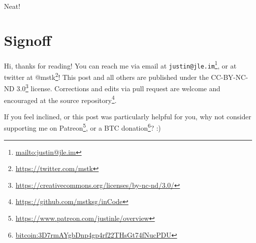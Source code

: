 \documentclass[]{article}
\renewcommand{\href}[2]{#2\footnote{\url{#1}}}
\begin{document}
Neat!

\hypertarget{signoff}{%
\section{Signoff}\label{signoff}}

Hi, thanks for reading! You can reach me via email at
\href{mailto:justin@jle.im}{\nolinkurl{justin@jle.im}}, or at twitter at
\href{https://twitter.com/mstk}{@mstk}! This post and all others are published
under the \href{https://creativecommons.org/licenses/by-nc-nd/3.0/}{CC-BY-NC-ND
3.0} license. Corrections and edits via pull request are welcome and encouraged
at \href{https://github.com/mstksg/inCode}{the source repository}.

If you feel inclined, or this post was particularly helpful for you, why not
consider \href{https://www.patreon.com/justinle/overview}{supporting me on
Patreon}, or a \href{bitcoin:3D7rmAYgbDnp4gp4rf22THsGt74fNucPDU}{BTC donation}?
:)
\end{document}
